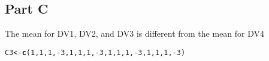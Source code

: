 \documentclass{article}\usepackage[]{graphicx}\usepackage[]{color}
\makeatletter
\newcommand{\hlnum}[1]{\textcolor[rgb]{0.686,0.059,0.569}{#1}}%
\newcommand{\hlopt}[1]{\textcolor[rgb]{0,0,0}{#1}}%
\newcommand{\hlstd}[1]{\textcolor[rgb]{0.345,0.345,0.345}{#1}}%
\newcommand{\hlkwb}[1]{\textcolor[rgb]{0.69,0.353,0.396}{#1}}%
\newcommand{\hlkwd}[1]{\textcolor[rgb]{0.737,0.353,0.396}{\textbf{#1}}}%
\newenvironment{kframe}{%
 \def\at@end@of@kframe{}%
 \ifinner\ifhmode%
  \def\at@end@of@kframe{\end{minipage}}%
  \begin{minipage}{\columnwidth}%
 \fi\fi%
 \def\FrameCommand##1{\hskip\@totalleftmargin \hskip-\fboxsep
 \colorbox{shadecolor}{##1}\hskip-\fboxsep
     \hskip-\linewidth \hskip-\@totalleftmargin \hskip\columnwidth}%
 \MakeFramed {\advance\hsize-\width
   \@totalleftmargin\z@ \linewidth\hsize
   \@setminipage}}%
 {\par\unskip\endMakeFramed%
 \at@end@of@kframe}
\newenvironment{knitrout}{}{} %
\makeatother
\begin{document}
\subsection{Part C}
The mean for DV1, DV2, and DV3 is different from the mean for DV4
\begin{knitrout}
\color{fgcolor}\begin{kframe}
\begin{alltt}
\hlstd{C3} \hlkwb{<-} \hlkwd{c}\hlstd{(}\hlnum{1}\hlstd{,}\hlnum{1}\hlstd{,}\hlnum{1}\hlstd{,}\hlopt{-}\hlnum{3}\hlstd{,} \hlnum{1}\hlstd{,}\hlnum{1}\hlstd{,}\hlnum{1}\hlstd{,}\hlopt{-}\hlnum{3}\hlstd{,} \hlnum{1}\hlstd{,}\hlnum{1}\hlstd{,}\hlnum{1}\hlstd{,}\hlopt{-}\hlnum{3}\hlstd{,} \hlnum{1}\hlstd{,}\hlnum{1}\hlstd{,}\hlnum{1}\hlstd{,}\hlopt{-}\hlnum{3}\hlstd{)}
\end{alltt}
\end{kframe}
\end{knitrout}
\end{document}
